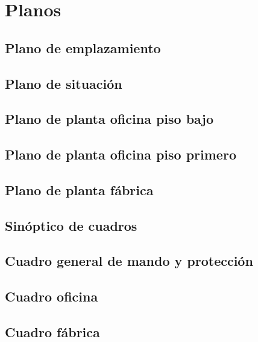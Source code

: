 \section{Planos}

\subsection{Plano de emplazamiento}
\pagebreak 

\subsection{Plano de situación}
\pagebreak 

\subsection{Plano de planta oficina piso bajo}
\pagebreak 

\subsection{Plano de planta oficina piso primero}
\pagebreak 

\subsection{Plano de planta fábrica}
\pagebreak 

\subsection{Sinóptico de cuadros}
\pagebreak 

\subsection{Cuadro general de mando y protección}
\pagebreak 

\subsection{Cuadro oficina}
\pagebreak 

\subsection{Cuadro fábrica}
\pagebreak 